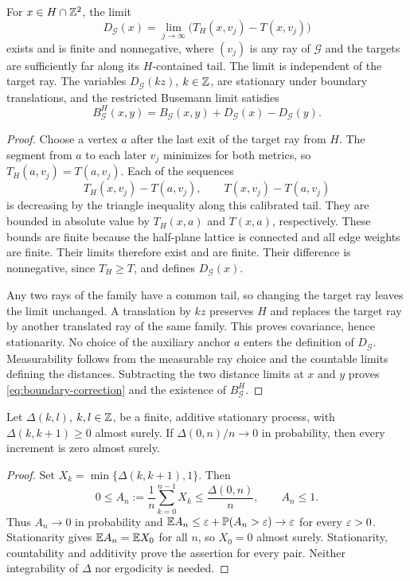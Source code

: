\begin{lemma}\label{lem:boundary-correction}
For \(x\in H\cap\mathbb Z^2\), the limit
\[
 D_{\mathcal G}(x)
 =\lim_{j\to\infty}\bigl(T_H(x,v_j)-T(x,v_j)\bigr)
\]
exists and is finite and nonnegative, where \((v_j)\) is any ray of
\(\mathcal G\) and the targets are sufficiently far along its
\(H\)-contained tail. The limit is independent of the target ray.
The variables \(D_{\mathcal G}(kz)\), \(k\in\mathbb Z\), are stationary
under boundary translations, and the restricted Busemann limit satisfies
\begin{equation}\label{eq:boundary-correction}
 B_{\mathcal G}^H(x,y)
 =B_{\mathcal G}(x,y)+D_{\mathcal G}(x)-D_{\mathcal G}(y).
\end{equation}
\end{lemma}
\begin{proof}
Choose a vertex \(a\) after the last exit of the target ray from \(H\).
The segment from \(a\) to each later \(v_j\) minimizes for both metrics,
so \(T_H(a,v_j)=T(a,v_j)\). Each of the sequences
\[
 T_H(x,v_j)-T(a,v_j),\qquad T(x,v_j)-T(a,v_j)
\]
is decreasing by the triangle inequality along this calibrated tail.
They are bounded in absolute value by \(T_H(x,a)\) and \(T(x,a)\),
respectively. These bounds are finite because the half-plane lattice
is connected and all edge weights are finite. Their limits therefore
exist and are finite. Their difference is nonnegative, since
\(T_H\geq T\), and defines \(D_{\mathcal G}(x)\).

Any two rays of the family have a common tail, so changing the target
ray leaves the limit unchanged. A translation by \(kz\) preserves
\(H\) and replaces the target ray by another translated ray of the
same family. This proves covariance, hence stationarity. No choice
of the auxiliary anchor \(a\) enters the definition of \(D_{\mathcal G}\).
Measurability follows from the measurable ray choice and the countable
limits defining the distances. Subtracting the two distance limits
at \(x\) and \(y\) proves \eqref{eq:boundary-correction} and the
existence of \(B_{\mathcal G}^H\).
\end{proof}

\begin{lemma}\label{lem:zero-boundary-difference}
Let \(\Delta(k,l)\), \(k,l\in\mathbb Z\), be a finite, additive stationary
process, with \(\Delta(k,k+1)\geq0\) almost surely. If
\(\Delta(0,n)/n\to0\) in probability, then every increment is zero
almost surely.
\end{lemma}
\begin{proof}
Set \(X_k=\min\{\Delta(k,k+1),1\}\). Then
\[
 0\leq A_n:=\frac1n\sum_{k=0}^{n-1}X_k
 \leq\frac{\Delta(0,n)}n,\qquad A_n\leq1.
\]
Thus \(A_n\to0\) in probability and
\(\mathbb E A_n\leq\varepsilon+\mathbb P(A_n>\varepsilon)\to\varepsilon\) for every \(\varepsilon>0\).
Stationarity gives \(\mathbb E A_n=\mathbb E X_0\) for all \(n\), so
\(X_0=0\) almost surely. Stationarity, countability and additivity
prove the assertion for every pair. Neither integrability of
\(\Delta\) nor ergodicity is needed.
\end{proof}

